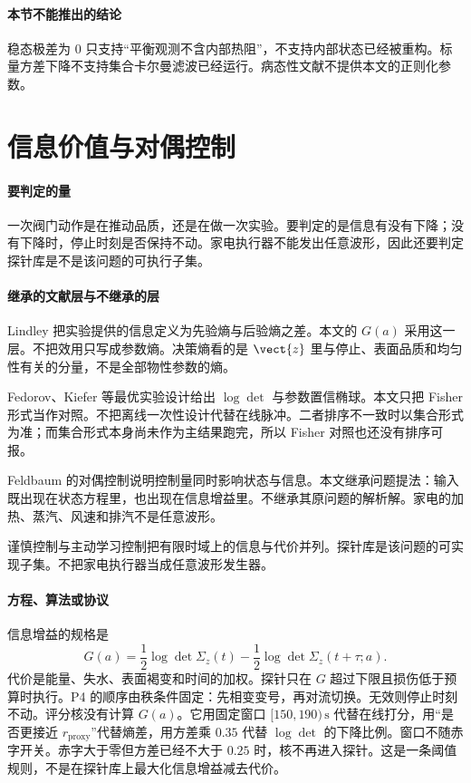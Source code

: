 \paragraph{本节不能推出的结论}
稳态极差为 $0$ 只支持“平衡观测不含内部热阻”，不支持内部状态已经被重构。标量方差下降不支持集合卡尔曼滤波已经运行。病态性文献不提供本文的正则化参数。

\section{信息价值与对偶控制}

\paragraph{要判定的量}
一次阀门动作是在推动品质，还是在做一次实验。要判定的是信息有没有下降；没有下降时，停止时刻是否保持不动。家电执行器不能发出任意波形，因此还要判定探针库是不是该问题的可执行子集。

\paragraph{继承的文献层与不继承的层}
Lindley 把实验提供的信息定义为先验熵与后验熵之差\cite{lindley1956}。本文的 $G(a)$ 采用这一层。不把效用只写成参数熵。决策熵看的是 $\vect{z}$ 里与停止、表面品质和均匀性有关的分量，不是全部物性参数的熵。

Fedorov、Kiefer 等最优实验设计给出 $\log\det$ 与参数置信椭球。本文只把 Fisher 形式当作对照。不把离线一次性设计代替在线脉冲。二者排序不一致时以集合形式为准；而集合形式本身尚未作为主结果跑完，所以 Fisher 对照也还没有排序可报。

Feldbaum 的对偶控制说明控制量同时影响状态与信息\cite{feldbaum1965}。本文继承问题提法：输入既出现在状态方程里，也出现在信息增益里。不继承其原问题的解析解。家电的加热、蒸汽、风速和排汽不是任意波形。

谨慎控制与主动学习控制把有限时域上的信息与代价并列。探针库是该问题的可实现子集。不把家电执行器当成任意波形发生器。

\paragraph{方程、算法或协议}
信息增益的规格是
\[
G(a)=\frac12\log\det\Sigma_z(t)-\frac12\log\det\Sigma_z(t+\tau;a).
\]
代价是能量、失水、表面褐变和时间的加权。探针只在 $G$ 超过下限且损伤低于预算时执行。P4 的顺序由秩条件固定：先相变变号，再对流切换。无效则停止时刻不动。评分核没有计算 $G(a)$。它用固定窗口 $[150,190)\,\mathrm{s}$ 代替在线打分，用“是否更接近 $r_{\mathrm{proxy}}$”代替熵差，用方差乘 $0.35$ 代替 $\log\det$ 的下降比例。窗口不随赤字开关。赤字大于零但方差已经不大于 $0.25$ 时，核不再进入探针。这是一条阈值规则，不是在探针库上最大化信息增益减去代价。

